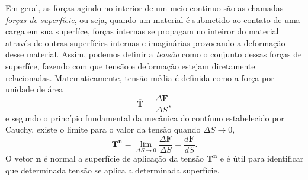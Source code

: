 Em geral, as for\c{c}as agindo no interior de um meio continuo s\~ao as chamadas \textit{for\c{c}as de superf\'icie}, ou seja, quando um material \'e submetido ao contato de uma carga em sua superf\'ice, for\c{c}as internas se propagam no inteiror do material atrav\'es de outras superf\'icies internas e imagin\'arias provocando a deforma\c{c}\~ao desse material. Assim, podemos definir a \textit{tens\~ao} como o conjunto dessas for\c{c}as de superf\'ice, fazendo com que tens\~ao e deforma\c{c}\~ao estejam diretamente relacionadas. Matematicamente, tens\~ao m\'edia \'e definida como a for\c{c}a por unidade de \'area
\begin{equation}\label{eq.tensao_media}
\mathbf{\overline{T}}=\frac{\Delta\mathbf{F}}{\Delta S},
\end{equation}
e segundo o princ\'ipio fundamental da mec\^anica do cont\'inuo estabelecido por Cauchy, existe o limite para o valor da tens\~ao quando $\Delta S\to 0$,
\begin{equation*}
\mathbf{T}^{\mathbf{n}}=\lim_{\Delta S\to 0}\frac{\Delta\mathbf{F}}{\Delta S}=\frac{d\mathbf{F}}{dS}.
\end{equation*}
O vetor $\mathbf{n}$ \'e normal a superf\'icie de aplica\c{c}\~ao da tens\~ao $\mathbf{T}^{\mathbf{n}}$ e \'e \'util para identificar que determinada tens\~ao se aplica a determinada superf\'icie.

